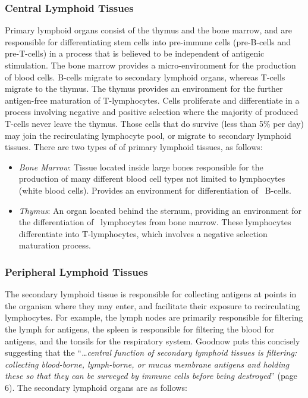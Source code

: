 %
%
\subsubsection{Central Lymphoid Tissues}
Primary lymphoid organs consist of the thymus and the bone marrow, and are responsible for differentiating stem cells into pre-immune cells (pre-B-cells and pre-T-cells) in a process that is believed to be independent of antigenic stimulation. The bone marrow provides a micro-environment for the production of blood cells. B-cells migrate to secondary lymphoid organs, whereas T-cells migrate to the thymus. The thymus provides an environment for the further antigen-free maturation of T-lymphocytes. Cells proliferate and differentiate in a process involving negative and positive selection where the majority of produced T-cells never leave the thymus. Those cells that do survive (less than 5\% per day) may join the recirculating lymphocyte pool, or migrate to secondary lymphoid tissues. There are two types of of primary lymphoid tissues, as follows:

\begin{itemize}
	\item \emph{Bone Marrow}: Tissue located inside large bones responsible for the production of many different blood cell types not limited to lymphocytes (white blood cells). Provides an environment for differentiation of \naive\ B-cells.
	\item \emph{Thymus}: An organ located behind the sternum, providing an environment for the differentiation of \naive\ lymphocytes from bone marrow. These lymphocytes differentiate into T-lymphocytes, which involves a negative selection maturation process.
\end{itemize}

% 
% 
\subsubsection{Peripheral Lymphoid Tissues}
The secondary lymphoid tissue is responsible for collecting antigens at points in the organism where they may enter, and facilitate their exposure to recirculating lymphocytes. For example, the lymph nodes are primarily responsible for filtering the lymph for antigens, the spleen is responsible for filtering the blood for antigens, and the tonsils for the respiratory system. Goodnow puts this concisely suggesting that the ``\emph{\ldots central function of secondary lymphoid tissues is filtering: collecting blood-borne, lymph-borne, or mucus membrane antigens and holding these so that they can be surveyed by immune cells before being destroyed}'' \cite{Goodnow1997} (page 6). The secondary lymphoid organs are as follows:

